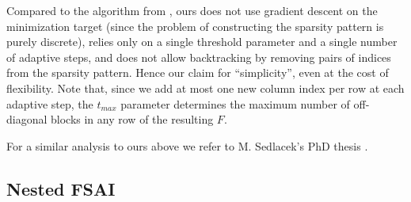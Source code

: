 \documentclass[a4paper]{article}
\theoremstyle{plain}
\theoremstyle{definition}
\theoremstyle{remark}
\begin{document}
\begin{algorithm}[!htb]
\begin{algorithmic}[1]
		
		\vspace{1em}
		
		\Else
		\EndIf
		
		\vspace{1em}
		
		\EndFor
		\EndFor
		
		\vspace{1em}
		
		

        \vspace{1em}

	\end{algorithmic}
\end{algorithm}


Compared to the algorithm from \cite{Janna2011}, ours does not use gradient descent on the minimization target (since the problem of constructing the sparsity pattern is purely discrete), relies only on a single threshold parameter and a single number of adaptive steps, and does not allow backtracking by removing pairs of indices from the sparsity pattern. Hence our claim for ``simplicity'', even at the cost of flexibility. Note that, since we add at most one new column index per row at each adaptive step, the \(t_{max}\) parameter determines the maximum number of off-diagonal blocks in any row of the resulting \(F\).

For a similar analysis to ours above we refer to M. Sedlacek's PhD thesis \cite[Appendix~C]{Sedlacek2012}.


\subsection{Nested FSAI}\label{sec:recursive_fsai}
\end{document}
